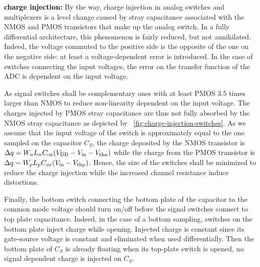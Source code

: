\textbf{\textcolor{black}{charge injection:}}
By the way, charge injection in analog switches and multiplexers is a level change caused by stray capacitance associated with the NMOS and PMOS transistors that make up the analog switch. In a fully differential architecture, this phenomenon is fairly reduced, but not annihilated. Indeed, the voltage commuted to the positive side is the opposite of the one on the negative side: at least a voltage-dependent error is introduced. In the case of switches connecting the input voltages, the error on the transfer function of the ADC is dependent on the input voltage.

As signal switches shall be complementary ones with at least PMOS 3.5 times larger than NMOS to reduce non-linearity dependent on the input voltage. The charges injected by PMOS stray capacitance are thus not fully absorbed by the NMOS stray capacitance as depicted by \figurename~\ref{fig:charge-injection-switches}. As we assume that the input voltage of the switch is approximately equal to the one sampled on the capacitor \(C_S\), the charge deposited by the NMOS transistor is \(\Delta q = W_nL_nC_{\rm ox}(V_{\rm DD}-V_{\rm in}-V_{\rm thn}) \) while the charge from the PMOS transistor is \(\Delta q = W_pL_pC_{ox}(V_{\rm in}-V_{\rm thp}) \). Hence, the size of the switches shall be minimized to reduce the charge injection while the increased channel resistance induce distortions.

Finally, the bottom switch connecting the bottom plate of the capacitor to the common mode voltage should turn on/off before the signal switches connect to top plate capacitance. Indeed, in the case of a bottom sampling, switches on the bottom plate inject charge while opening. Injected charge is constant since its gate-source voltage is constant and eliminated when used differentially. Then the bottom plate of \(C_S\) is already floating when its top-plate switch is opened, no signal dependent charge is injected on \(C_S\).

